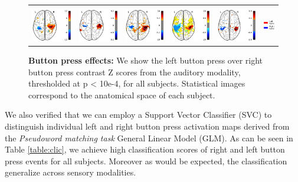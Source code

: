 \begin{figure}[ht]
\begin{tabular}{cccccl}
\hspace{1ex}
& {} \\
{\includegraphics[width=.14\linewidth]{figures/part_II/press_aud_01.pdf}}
\hspace{1ex}
&{\includegraphics[width=.14\linewidth]{figures/part_II/press_aud_03.pdf}}
\hspace{1ex}
&{\includegraphics[width=.14\linewidth]{figures/part_II/press_aud_04.pdf}}
\hspace{1ex}
&{\includegraphics[width=.14\linewidth]{figures/part_II/press_aud_05.pdf}}
\hspace{1ex}
&{\includegraphics[width=.14\linewidth]{figures/part_II/press_aud_06.pdf}}
\hspace{1ex}
&{\includegraphics[width=.10\linewidth]{figures/part_II/press_legend.pdf}} \\
\end{tabular}
\caption{\textbf{Button press effects:} We show the left button press over right button press contrast Z scores from the auditory modality, thresholded at p < 10e-4, for all subjects. Statistical images correspond to the anatomical space of each subject.}
\label{fig:button_press}
\end{figure}

We also verified that we can employ a Support Vector Classifier (SVC) to distinguish individual left and right button press activation maps derived from the \emph{Pseudoword matching task} General Linear Model (GLM).
As can be seen in Table \ref{table:clic}, we achieve high classification scores of right and left button press events for all subjects.
Moreover as would be expected, the classification generalize across sensory modalities.


